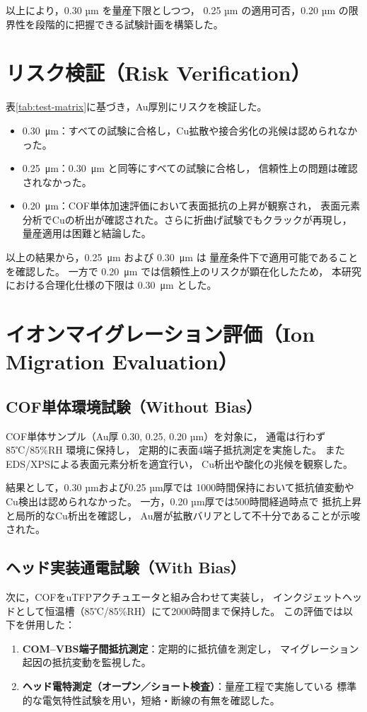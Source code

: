 \documentclass[conference]{IEEEtran}
\begin{document}
\vspace{2mm}
\noindent
以上により，0.30 µm を量産下限としつつ，
0.25 µm の適用可否，0.20 µm の限界性を段階的に把握できる試験計画を構築した。

\section{リスク検証（Risk Verification）}
表\ref{tab:test-matrix}に基づき，Au厚別にリスクを検証した。
\begin{itemize}
  \item \SI{0.30}{\micro\meter}：すべての試験に合格し，Cu拡散や接合劣化の兆候は認められなかった。
  \item \SI{0.25}{\micro\meter}：\SI{0.30}{\micro\meter} と同等にすべての試験に合格し，
        信頼性上の問題は確認されなかった。
  \item \SI{0.20}{\micro\meter}：COF単体加速評価において表面抵抗の上昇が観察され，
        表面元素分析でCuの析出が確認された。さらに折曲げ試験でもクラックが再現し，
        量産適用は困難と結論した。
\end{itemize}

以上の結果から，\SI{0.25}{\micro\meter} および \SI{0.30}{\micro\meter} は
量産条件下で適用可能であることを確認した。  
一方で \SI{0.20}{\micro\meter} では信頼性上のリスクが顕在化したため，
本研究における合理化仕様の下限は \SI{0.30}{\micro\meter} とした。

\section{イオンマイグレーション評価（Ion Migration Evaluation）}

\subsection{COF単体環境試験（Without Bias）}
COF単体サンプル（Au厚 0.30, 0.25, 0.20 µm）を対象に，
通電は行わず 85℃/85\%RH 環境に保持し，
定期的に表面4端子抵抗測定を実施した。
またEDS/XPSによる表面元素分析を適宜行い，
Cu析出や酸化の兆候を観察した。

結果として，0.30 µmおよび0.25 µm厚では
1000時間保持において抵抗値変動やCu検出は認められなかった。
一方，0.20 µm厚では500時間経過時点で
抵抗上昇と局所的なCu析出を確認し，
Au層が拡散バリアとして不十分であることが示唆された。

\subsection{ヘッド実装通電試験（With Bias）}
次に，COFをuTFPアクチュエータと組み合わせて実装し，
インクジェットヘッドとして恒温槽（85℃/85\%RH）にて2000時間まで保持した。  
この評価では以下を併用した：
\begin{enumerate}
  \item \textbf{COM--VBS端子間抵抗測定}：定期的に抵抗値を測定し，
        マイグレーション起因の抵抗変動を監視した。
  \item \textbf{ヘッド電特測定（オープン／ショート検査）}：量産工程で実施している
        標準的な電気特性試験を用い，短絡・断線の有無を確認した。
\end{enumerate}
\end{document}
